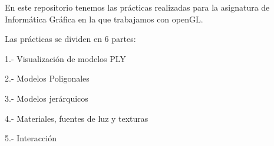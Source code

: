 En este repositorio tenemos las prácticas realizadas para la asignatura de Informática Gráfica en la que trabajamos con open\+G\+L.

Las prácticas se dividen en 6 partes\+:

1.-\/ Visualización de modelos P\+L\+Y

2.-\/ Modelos Poligonales

3.-\/ Modelos jerárquicos

4.-\/ Materiales, fuentes de luz y texturas

5.-\/ Interacción 